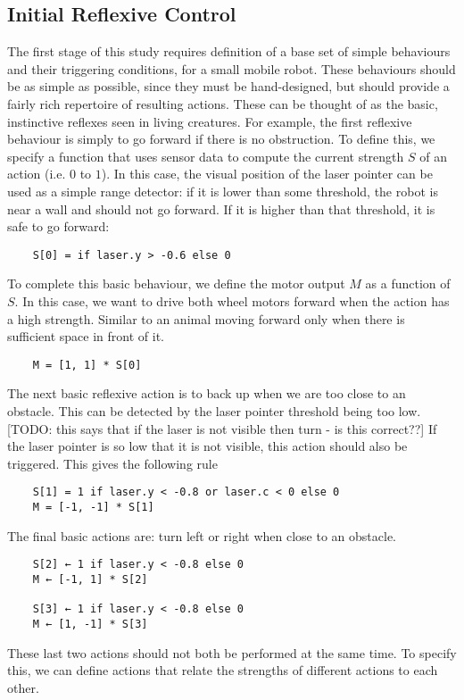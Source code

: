 \documentclass[conference]{IEEEtran}
\begin{document}
\subsection{Initial Reflexive Control}
The first stage of this study requires definition of a base set of simple behaviours and their triggering conditions, for a small mobile robot. These behaviours should be as simple as possible, since they must be hand-designed, but should provide a fairly rich repertoire of resulting actions. These can be thought of as the basic, instinctive reflexes seen in living creatures. For example, the first reflexive behaviour is simply to go forward if there is no obstruction. To define this, we specify a function that uses sensor data to compute the current strength $S$ of an action (i.e. $0$ to $1$). In this case, the visual position of the laser pointer can be used as a simple range detector: if it is lower than some threshold, the robot is near a wall and should not go forward. If it is higher than that threshold, it is safe to go forward:
\begin{lstlisting}
	S[0] = if laser.y > -0.6 else 0
\end{lstlisting}
To complete this basic behaviour, we define the motor output $M$ as a function of $S$. In this case, we want to drive both wheel motors forward when the action has a high strength. Similar to an animal moving forward only when there is sufficient space in front of it.
\begin{lstlisting}
	M = [1, 1] * S[0]
\end{lstlisting}
The next basic reflexive action is to back up when we are too close to an obstacle. This can be detected by the laser pointer threshold being too low. [TODO: this says that if the laser is not visible then turn - is this correct??] If the laser pointer is so low that it is not visible, this action should also be triggered. This gives the following rule
\begin{lstlisting}
	S[1] = 1 if laser.y < -0.8 or laser.c < 0 else 0
	M = [-1, -1] * S[1]
\end{lstlisting}
The final basic actions are: turn left or right when close to an obstacle. 
\begin{lstlisting}
	S[2] ← 1 if laser.y < -0.8 else 0
	M ← [-1, 1] * S[2]

	S[3] ← 1 if laser.y < -0.8 else 0
	M ← [1, -1] * S[3]
\end{lstlisting}
These last two actions should not both be performed at the same time. To specify this, we can define actions that relate the strengths of different actions to each other.
\end{document}
